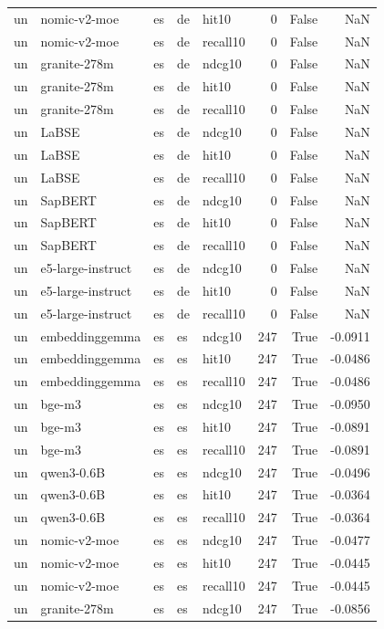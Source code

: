 \begin{tabular}{lllllrrr}
un & nomic-v2-moe & es & de & hit10 & 0 & False & NaN \\
un & nomic-v2-moe & es & de & recall10 & 0 & False & NaN \\
un & granite-278m & es & de & ndcg10 & 0 & False & NaN \\
un & granite-278m & es & de & hit10 & 0 & False & NaN \\
un & granite-278m & es & de & recall10 & 0 & False & NaN \\
un & LaBSE & es & de & ndcg10 & 0 & False & NaN \\
un & LaBSE & es & de & hit10 & 0 & False & NaN \\
un & LaBSE & es & de & recall10 & 0 & False & NaN \\
un & SapBERT & es & de & ndcg10 & 0 & False & NaN \\
un & SapBERT & es & de & hit10 & 0 & False & NaN \\
un & SapBERT & es & de & recall10 & 0 & False & NaN \\
un & e5-large-instruct & es & de & ndcg10 & 0 & False & NaN \\
un & e5-large-instruct & es & de & hit10 & 0 & False & NaN \\
un & e5-large-instruct & es & de & recall10 & 0 & False & NaN \\
un & embeddinggemma & es & es & ndcg10 & 247 & True & -0.0911 \\
un & embeddinggemma & es & es & hit10 & 247 & True & -0.0486 \\
un & embeddinggemma & es & es & recall10 & 247 & True & -0.0486 \\
un & bge-m3 & es & es & ndcg10 & 247 & True & -0.0950 \\
un & bge-m3 & es & es & hit10 & 247 & True & -0.0891 \\
un & bge-m3 & es & es & recall10 & 247 & True & -0.0891 \\
un & qwen3-0.6B & es & es & ndcg10 & 247 & True & -0.0496 \\
un & qwen3-0.6B & es & es & hit10 & 247 & True & -0.0364 \\
un & qwen3-0.6B & es & es & recall10 & 247 & True & -0.0364 \\
un & nomic-v2-moe & es & es & ndcg10 & 247 & True & -0.0477 \\
un & nomic-v2-moe & es & es & hit10 & 247 & True & -0.0445 \\
un & nomic-v2-moe & es & es & recall10 & 247 & True & -0.0445 \\
un & granite-278m & es & es & ndcg10 & 247 & True & -0.0856 \\

\end{tabular}
